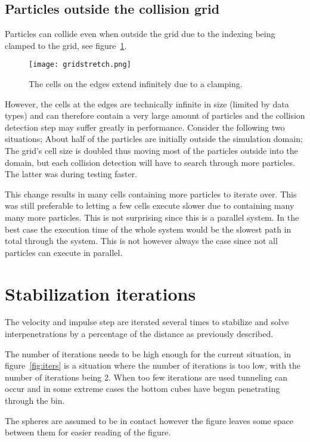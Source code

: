 \subsection{Particles outside the collision grid}
Particles can collide even when outside the grid due to the indexing
being clamped to the grid, see figure~\ref{fig:gridStretch}.

\begin{figure}[H]
  \centering
  \texttt{[image: gridstretch.png]}
  \caption{The cells on the edges extend infinitely due to a clamping.\label{fig:gridStretch}}
\end{figure}

However, the cells at the edges are technically infinite
in size (limited by data types) and can therefore contain a very large amount of particles and the collision
detection step may suffer greatly in performance. Consider the following two situations;
About half of the particles are initially outside the simulation domain; The grid's
cell size is doubled thus moving most of the particles outside into the domain, but
each collision detection will have to search through more particles.
The latter was during testing faster.

This change results in many cells containing more particles to iterate over. This was still preferable to
 letting a few cells execute slower due to containing many many more particles.
This is not surprising since this is a
parallel system. In the best case the execution time of the whole system would be
the slowest path in total through the system. This is not however always the case
since not all particles can execute in parallel.

\section{Stabilization iterations} \label{sec:stabil}
The velocity and impulse step are iterated several times to stabilize and solve
interpenetrations by a percentage of the distance as previously described.

The number of iterations needs to be high enough for the current situation, in
figure~\ref{fig:iters} is a situation where the number of iterations is too low, with the
number of iterations being 2. When too few iterations are used tunneling can occur
and in some extreme cases the bottom cubes have begun penetrating through the bin.

The spheres are assumed to be in contact however
the figure leaves some space between them for easier reading of the figure.

